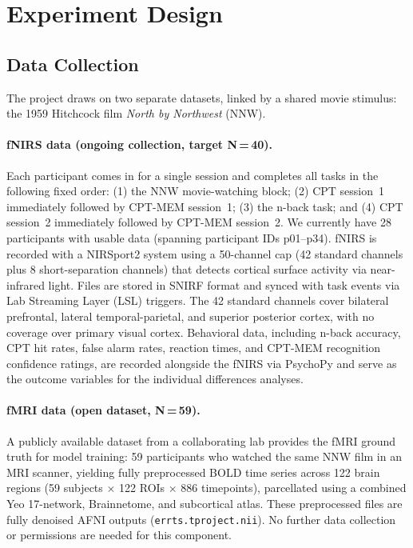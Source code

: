 
\section{Experiment Design}

\subsection{Data Collection}

The project draws on two separate datasets, linked by a shared movie stimulus: the 1959 Hitchcock film \textit{North by Northwest} (NNW).

\paragraph{fNIRS data (ongoing collection, target N\,=\,40).} Each participant comes in for a single session and completes all tasks in the following fixed order: (1) the NNW movie-watching block; (2) CPT session~1 immediately followed by CPT-MEM session~1; (3) the n-back task; and (4) CPT session~2 immediately followed by CPT-MEM session~2. We currently have 28 participants with usable data (spanning participant IDs p01--p34). fNIRS is recorded with a NIRSport2 system using a 50-channel cap (42 standard channels plus 8 short-separation channels) that detects cortical surface activity via near-infrared light. Files are stored in SNIRF format and synced with task events via Lab Streaming Layer (LSL) triggers. The 42 standard channels cover bilateral prefrontal, lateral temporal-parietal, and superior posterior cortex, with no coverage over primary visual cortex. Behavioral data, including n-back accuracy, CPT hit rates, false alarm rates, reaction times, and CPT-MEM recognition confidence ratings, are recorded alongside the fNIRS via PsychoPy and serve as the outcome variables for the individual differences analyses.

\paragraph{fMRI data (open dataset, N\,=\,59).} A publicly available dataset from a collaborating lab provides the fMRI ground truth for model training: 59 participants who watched the same NNW film in an MRI scanner, yielding fully preprocessed BOLD time series across 122 brain regions (59 subjects $\times$ 122 ROIs $\times$ 886 timepoints), parcellated using a combined Yeo 17-network, Brainnetome, and subcortical atlas. These preprocessed files are fully denoised AFNI outputs (\texttt{errts.tproject.nii}). No further data collection or permissions are needed for this component.

